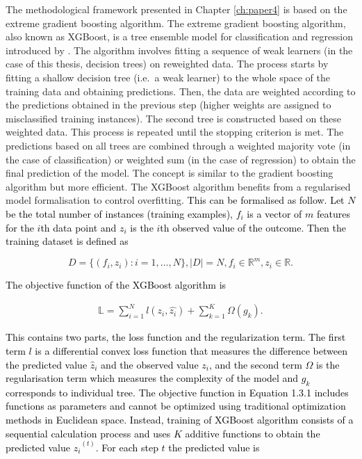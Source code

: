 \documentclass{monashthesis}
\begin{document}
The methodological framework presented in Chapter \ref{ch:paper4} is based on the extreme gradient boosting algorithm. The extreme gradient boosting algorithm, also known as XGBoost, is a tree ensemble model for classification and regression introduced by \textcite{chen2016xgboost}. The algorithm involves fitting a sequence of weak learners (in the case of this thesis, decision trees) on reweighted data. The process starts by fitting a shallow decision tree (i.e.~a weak learner) to the whole space of the training data and obtaining predictions. Then, the data are weighted according to the predictions obtained in the previous step (higher weights are assigned to misclassified training instances). The second tree is constructed based on these weighted data. This process is repeated until the stopping criterion is met. The predictions based on all trees are combined through a weighted majority vote (in the case of classification) or weighted sum (in the case of regression) to obtain the final prediction of the model. The concept is similar to the gradient boosting algorithm \autocite{friedman2001greedy} but more efficient. The XGBoost algorithm benefits from a regularised model formalisation to control overfitting. \textcolor{black}{This can be formalised as follow. Let $N$ be the total number of instances (training examples), $f_i$ is a vector of $m$ features for the $i$th data point and $z_i$ is the $i$th observed value of the outcome. Then the training dataset is defined as}

\vspace*{-\baselineskip}

\[D=\{(f_i, z_i): i =1,\dots, N\}, |D|=N, f_i \in \mathbb{R}^m, z_i \in \mathbb{R}.\]

\textcolor{black}{The objective function of the XGBoost algorithm is}

\vspace*{-\baselineskip}

\begin{align}
\mathbb{L}=\sum_{i=1}^{N}l( z_i, \hat{z_i})+\sum_{k=1}^K \Omega(g_{k}).
\end{align}

\textcolor{black}{This contains two parts, the loss function and the regularization term. The first term $l$ is a differential convex loss function that measures the difference between the predicted value $\hat{z}_i$ and the observed value $z_i$, and the second term $\Omega$ is the regularisation term which measures the complexity of the model and $g_k$ corresponds to individual tree. The objective function in Equation  1.3.1 includes functions as parameters and cannot be optimized using traditional optimization methods in Euclidean space. Instead, training of XGBoost algorithm consists of a sequential calculation process and uses $K$ additive functions to obtain the predicted value $\hat{z_i}^{(t)}$.  For each step $t$ the predicted value is}
\end{document}
